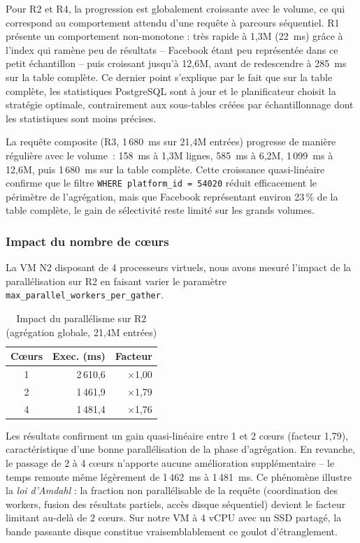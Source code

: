 \documentclass[10pt,twocolumn,a4paper]{article}
\begin{document}
Pour R2 et R4, la progression est globalement croissante
avec le volume, ce qui correspond au comportement attendu
d'une requête à parcours séquentiel. R1 présente un
comportement non-monotone : très rapide à 1,3M (22~ms)
grâce à l'index qui ramène peu de résultats -- Facebook
étant peu représentée dans ce petit échantillon -- puis
croissant jusqu'à 12,6M, avant de redescendre à 285~ms
sur la table complète. Ce dernier point s'explique par
le fait que sur la table complète, les statistiques
PostgreSQL sont à jour et le planificateur choisit
la stratégie optimale, contrairement aux sous-tables
créées par échantillonnage dont les statistiques sont
moins précises.

La requête composite (R3, 1\,680~ms sur 21,4M entrées)
progresse de manière régulière avec le volume~: 158~ms
à 1,3M lignes, 585~ms à 6,2M, 1\,099~ms à 12,6M, puis
1\,680~ms sur la table complète. Cette croissance
quasi-linéaire confirme que le filtre \texttt{WHERE
platform\_id = 54020} réduit efficacement le périmètre
de l'agrégation, mais que Facebook représentant environ
23\,\% de la table complète, le gain de sélectivité
reste limité sur les grands volumes.

\subsubsection{Impact du nombre de c\oe{}urs}

La VM N2 disposant de 4 processeurs virtuels, nous avons
mesuré l'impact de la parallélisation sur R2 en faisant
varier le paramètre \texttt{max\_parallel\_workers\_per\_gather}.

\begin{table}[H]
\centering
\caption{Impact du parallélisme sur R2 (agrégation globale,
21,4M entrées)}
\label{tab:cores-perf}
\footnotesize
\begin{tabular}{crr}
\hline
\textbf{C\oe{}urs} & \textbf{Exec. (ms)} & \textbf{Facteur} \\
\hline
1 & 2\,610{,}6 & $\times$1{,}00 \\
2 & 1\,461{,}9 & $\times$1{,}79 \\
4 & 1\,481{,}4 & $\times$1{,}76 \\
\hline
\end{tabular}
\end{table}

Les résultats confirment un gain quasi-linéaire entre 1 et
2 cœurs (facteur 1,79), caractéristique d'une bonne
parallélisation de la phase d'agrégation. En revanche,
le passage de 2 à 4 cœurs n'apporte aucune amélioration
supplémentaire -- le temps remonte même légèrement de
1\,462~ms à 1\,481~ms. Ce phénomène illustre la
\textit{loi d'Amdahl} : la fraction non parallélisable
de la requête (coordination des workers, fusion des
résultats partiels, accès disque séquentiel) devient
le facteur limitant au-delà de 2 cœurs. Sur notre VM
à 4 vCPU avec un SSD partagé, la bande passante disque
constitue vraisemblablement ce goulot d'étranglement.
\end{document}
